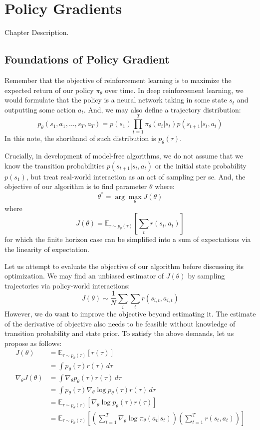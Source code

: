 \chapter{Policy Gradients}
Chapter Description.

\section{Foundations of Policy Gradient}
Remember that the objective of reinforcement learning is to maximize the expected return of our policy $\pi_\theta$ over time.
In deep reinforcement learning, we would formulate that the policy is a neural network taking in some state $s_t$ and outputting some action $a_t$.
And, we may also define a trajectory distribution:
\[
    p_\theta (s_1, a_1, \dots, s_T, a_T) = p(s_1) \prod_{t=1}^T \pi_\theta (a_t | s_t) p(s_{t+1} | s_t, a_t)
\]
In this note, the shorthand of such distribution is $p_\theta (\tau)$.

Crucially, in development of model-free algorithms, we do not assume that we know the transition probabilities $p(s_{t+1} | s_t, a_t)$ or the initial state probability $p(s_1)$, but treat real-world interaction as an act of sampling per se.
And, the objective of our algorithm is to find parameter $\theta$ where:
\[
    \theta^* = \arg \max_\theta J(\theta)
\]
where
\[
    J(\theta) = \mathbb{E}_{\tau \sim p_\theta (\tau)} \left[ \sum_t r(s_t, a_t) \right]
\]
for which the finite horizon case can be simplified into a sum of expectations via the linearity of expectation.

Let us attempt to evaluate the objective of our algorithm before discussing its optimization.
We may find an unbiased estimator of $J(\theta)$ by sampling trajectories via policy-world interactions:
\[
    J(\theta) \sim \frac{1}{N} \sum_i \sum_t r(s_{i,t}, a_{i,t})
\]
However, we do want to improve the objective beyond estimating it.
The estimate of the derivative of objective also needs to be feasible without knowledge of transition probability and state prior.
To satisfy the above demands, let us propose as follows:
\begin{align*}
    J(\theta) &= \mathbb{E}_{\tau \sim p_\theta (\tau)} [r(\tau)] \\
    &= \int p_\theta(\tau) r(\tau) \,d\tau \\
    \nabla_\theta J(\theta) &= \int \nabla_\theta p_\theta(\tau) r(\tau) \,d\tau \\
    &= \int p_\theta(\tau) \nabla_\theta \log p_\theta(\tau) r(\tau) \,d\tau \\
    &= \mathbb{E}_{\tau \sim p_\theta (\tau)} [\nabla_\theta \log p_\theta(\tau) r(\tau)] \\
    &= \mathbb{E}_{\tau \sim p_\theta (\tau)} \left[ \left( \sum_{t=1}^T \nabla_\theta \log \pi_\theta (a_t | s_t) \right) \left( \sum_{t=1}^T r(s_t, a_t) \right) \right]
\end{align*}

